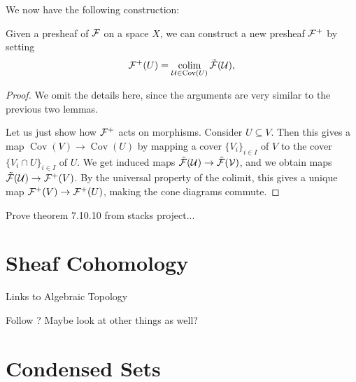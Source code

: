 \documentclass{article}
\DeclareMathOperator{\Cov}{Cov}
\DeclareMathOperator{\colim}{colim}
\begin{document}
We now have the following construction:
\begin{lemma}
    Given a presheaf of $\mathcal{F}$ on a space $X$, we can construct
    a new presheaf $\mathcal{F}^+$ by setting
    \begin{equation*}
        \mcF^+(U) = \colim_{\mcU \in \Cov(U)} \tilde{\mcF}(\mcU),
    \end{equation*}
\end{lemma}
\begin{proof}
    We omit the details here, since the arguments are very similar
    to the previous two lemmas.

    Let us just show how $\mathcal{F}^+$ acts on morphisms. Consider
    $U \subseteq V$. Then this gives a map $\Cov(V) \to \Cov(U)$
    by mapping a cover $\{V_i\}_{i\in I}$ of $V$ to the cover $\{V_i \cap U\}_{i\in I}$
    of $U$. We get induced maps $\tilde{\mathcal{F}}(\mathcal{U}) \to \tilde{\mathcal{F}}(\mathcal{V})$,
    and we obtain maps $\tilde{\mathcal{F}}(\mathcal{U}) \to \mathcal{F}^+(V)$.
    By the universal property of the colimit, this gives a unique map
    $\mathcal{F}^+(V) \to \mathcal{F}^+(U)$, making the cone diagrams commute.
\end{proof}

Prove theorem 7.10.10 from stacks project...

\section{Sheaf Cohomology}
Links to Algebraic Topology

Follow \cite{Tu2022IntroductionSC}?
Maybe look at other things as well?
\section{Condensed Sets}


\end{document}
